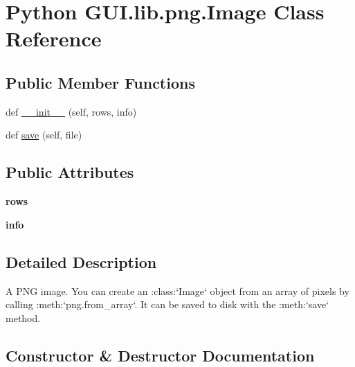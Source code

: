 \hypertarget{class_python_01_g_u_i_1_1lib_1_1png_1_1_image}{}\section{Python G\+U\+I.\+lib.\+png.\+Image Class Reference}
\label{class_python_01_g_u_i_1_1lib_1_1png_1_1_image}
\subsection*{Public Member Functions}
\begin{DoxyCompactItemize}
\item 
def \hyperlink{class_python_01_g_u_i_1_1lib_1_1png_1_1_image_a24ba3c89a195c2b8d73b196573953227}{\+\_\+\+\_\+init\+\_\+\+\_\+} (self, rows, info)
\item 
def \hyperlink{class_python_01_g_u_i_1_1lib_1_1png_1_1_image_a6c261eaa593765a1683a2858947f49b6}{save} (self, file)
\end{DoxyCompactItemize}
\subsection*{Public Attributes}
\begin{DoxyCompactItemize}
\item 
\mbox{\label{class_python_01_g_u_i_1_1lib_1_1png_1_1_image_a4c755554bd7c28c1eeffaccd69c70cbd}} 
{\bfseries rows}
\item 
\mbox{\label{class_python_01_g_u_i_1_1lib_1_1png_1_1_image_afa698a33900b640b57ebfaef9f1304a9}} 
{\bfseries info}
\end{DoxyCompactItemize}


\subsection{Detailed Description}
\begin{DoxyVerb}A PNG image.  You can create an :class:`Image` object from
an array of pixels by calling :meth:`png.from_array`.  It can be
saved to disk with the :meth:`save` method.
\end{DoxyVerb}
 

\subsection{Constructor \& Destructor Documentation}
\mbox{\label{class_python_01_g_u_i_1_1lib_1_1png_1_1_image_a24ba3c89a195c2b8d73b196573953227}} 
